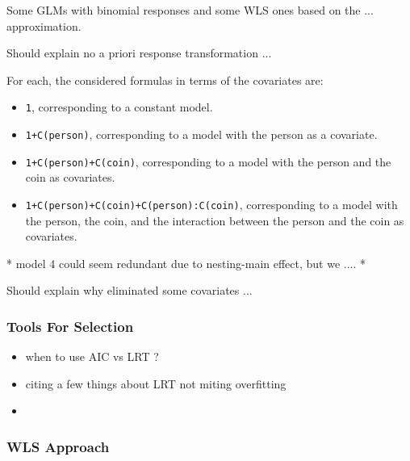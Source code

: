 \documentclass[a4paper, 12pt,oneside]{article}
\begin{document}
			Some GLMs with binomial responses and some WLS ones based on the ... approximation.
			
			Should explain no a priori response transformation ...
			
			For each, the considered formulas in terms of the covariates are:
			\begin{itemize}
				\item \texttt{1}, corresponding to a constant model.
				\item \texttt{1+C(person)}, corresponding to a model with the person as a covariate.
				\item \texttt{1+C(person)+C(coin)}, corresponding to a model with the person and the coin as covariates.
				\item \texttt{1+C(person)+C(coin)+C(person):C(coin)}, corresponding to a model with the person, the coin, and the interaction between the person and the coin as covariates.
			\end{itemize}
			* model 4 could seem redundant due to nesting-main effect, but we ....
			*  

			Should explain why eliminated some covariates ...
			\subsubsection{Tools For Selection}
			\begin{itemize}
				\item when to use AIC vs LRT ?
				\item citing a few things about LRT not miting overfitting 
				\item 
			\end{itemize}
			\subsubsection{WLS Approach}
\end{document}
